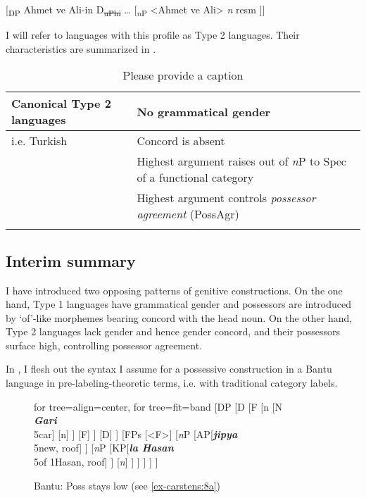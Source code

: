 \documentclass[output=paper
,modfonts
,nonflat]{langsci/langscibook}
\begin{document}
\begin{exe}
	{[}\textsubscript{DP} Ahmet ve Ali-in D\textsubscript{\sout{uPhi}} … {[}\textsubscript{\textit{n}P} <Ahmet ve Ali>  \textit{n} resm {]}{]}
\end{exe}
I will refer to languages with this profile as Type 2 languages. Their characteristics are summarized in .\pagebreak

\begin{table}
	\caption{\color{red}Please provide a caption}
	\label{tab-carstens:2}
	\begin{tabularx}{\textwidth}{lX}
		\lsptoprule
		Canonical Type 2 languages &  No grammatical gender\\\midrule
		i.e. Turkish  & Concord is absent\\
		& Highest argument raises out of \textit{n}P to Spec of a functional category\\
		& Highest argument controls \textit{possessor agreement} (PossAgr)\\
		\lspbottomrule
	\end{tabularx}
\end{table}

\subsection{Interim summary} \label{sec-carstens:2.3}

I have introduced two opposing patterns of genitive constructions. On the one hand, Type 1 languages have grammatical gender and possessors are introduced by ‘of’-like morphemes bearing concord with the head noun. On the other hand, Type 2 languages lack gender and hence gender concord, and their possessors surface high, controlling possessor agreement. 

In , I flesh out the syntax I assume for a possessive construction in a Bantu language in pre-labeling-theoretic terms, i.e. with traditional category labels.

	\begin{figure}[p]\small
			\caption{Bantu: Poss stays low (see \ref{ex-carstens:8a})\label{fig:carstens:Bantulow}}
			\begin{forest} for tree={align=center}, for tree={fit=band}
				[DP 
				[D	
				[F
				[n
				[N\\ \textit{\textbf{Gari}}\\5car]
				[n] ]
				[F] ] 
				[D] ]
				[FPs
				[<F>]
				[\textit{n}P
				[AP[\textit{\textbf{jipya}}\\5new, roof] ]
				[\textit{n}P
				[KP[\textit{\textbf{la Hasan}}\\5of 1Hasan, roof] ]
				[\textit{n}\textquotesingle
				[<\textit{n}>]
				[NP[<N>, roof] ]
				] ] ] ] ]
		\end{forest}
	\end{figure} 
\end{document}
